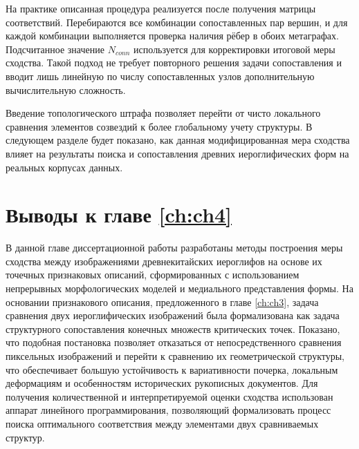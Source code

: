На практике описанная процедура реализуется после получения матрицы соответствий. Перебираются все комбинации сопоставленных пар вершин, и для каждой комбинации выполняется проверка наличия рёбер в обоих метаграфах. Подсчитанное значение $N_{conn}$ используется для корректировки итоговой меры сходства. Такой подход не требует повторного решения задачи сопоставления и вводит лишь линейную по числу сопоставленных узлов дополнительную вычислительную сложность.

Введение топологического штрафа позволяет перейти от чисто локального сравнения элементов созвездий к более глобальному учету структуры. В следующем разделе будет показано, как данная модифицированная мера сходства влияет на результаты поиска и сопоставления древних иероглифических форм на реальных корпусах данных.


\section{Выводы к главе \cref{ch:ch4}}

В данной главе диссертационной работы разработаны методы построения меры сходства между изображениями древнекитайских иероглифов на основе их точечных признаковых описаний, сформированных с использованием непрерывных морфологических моделей и медиального представления формы. На основании признакового описания, предложенного в главе \cref{ch:ch3}, задача сравнения двух иероглифических изображений была формализована как задача структурного сопоставления конечных множеств критических точек. Показано, что подобная постановка позволяет отказаться от непосредственного сравнения пиксельных изображений и перейти к сравнению их геометрической структуры, что обеспечивает большую устойчивость к вариативности почерка, локальным деформациям и особенностям исторических рукописных документов. Для получения количественной и интерпретируемой оценки сходства использован аппарат линейного программирования, позволяющий формализовать процесс поиска оптимального соответствия между элементами двух сравниваемых структур.

